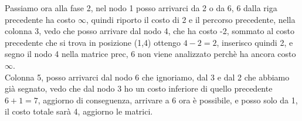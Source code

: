 \documentclass{article}
\begin{document}



Passiamo ora alla fase 2, nel nodo 1 posso arrivarci da 2 o da 6, 6 dalla riga precedente ha costo $\infty$, quindi riporto il costo di 2 e il percorso precedente, nella colonna 3, vedo che posso arrivare dal nodo 4, che ha costo -2, sommato al costo precedente che si trova in posizione (1,4) ottengo $4-2=2$, inserisco quindi 2, e segno il nodo 4 nella matrice prec, 6 non viene analizzato perchè ha ancora costo $\infty$.\\
Colonna 5, posso arrivarci dal nodo 6 che ignoriamo, dal 3 e dal 2 che abbiamo già segnato, vedo che dal nodo 3 ho un costo inferiore di quello precedente $6+1=7$, aggiorno di conseguenza, arrivare a 6 ora è possibile, e posso solo da 1, il costo totale sarà 4, aggiorno le matrici.


\end{document}
